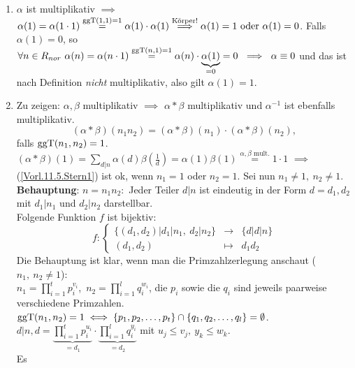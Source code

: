 \documentclass[a4paper,twoside,DIV15,BCOR12mm]{scrbook}
\begin{document}
\begin{beweis}
    \begin{enumerate}\item
        $\alpha$ ist multiplikativ $\implies$ $\alpha(1)=\alpha(1
        \cdot 1)\stackrel{\mathop{\rm ggT}\nolimits(1,1)=1}{=} \alpha(1) \cdot \alpha(1)
        \stackrel{\text{Körper!}}{\implies} \alpha(1)=1 \text{ oder }
        \alpha(1)=0$. Falls $\alpha(1)=0$, so $\forall n\in R_{nor}\
        \alpha(n)=\alpha(n \cdot
        1)\stackrel{\mathop{\rm ggT}\nolimits(n,1)=1}{=}\alpha(n)\cdot
        \underbrace{\alpha(1)}_{=0}=0\ \implies\ \alpha \equiv 0$ und
        das ist nach Definition
        \emph{nicht} multiplikativ, also gilt $\alpha(1)=1$.

        \item Zu zeigen: $\alpha,\beta$ multiplikativ $\implies$ $ \alpha*\beta$
        multiplikativ und $\alpha^{-1}$ ist ebenfalls multiplikativ.
        \begin{equation}(\alpha * \beta)(n_1 n_2)=(\alpha * \beta) (n_1) \cdot
        (\alpha * \beta)(n_2)\label{Vorl.11.5.Stern1},\end{equation}
        falls $\mathop{\rm ggT}\nolimits(n_1,n_2)=1$. $(\alpha *
        \beta)(1)=\sum_{d|n} \alpha(d) \beta(\frac 1 d )=\alpha(1)
        \beta(1)\stackrel{\alpha,\beta \text{ mult.}}{=}1\cdot 1$
        $\implies$ (\ref{Vorl.11.5.Stern1}) ist ok, wenn $n_1=1$ oder
        $n_2=1$. Sei nun $n_1 \neq 1,\ n_2\neq 1$.\\
        \textbf{Behauptung}: $n=n_1 n_2:$ Jeder Teiler $d|n$ ist
        eindeutig in der Form $d=d_1,d_2$ mit $d_1|n_1$ und
        $d_2|n_2$ darstellbar.\\
        Folgende Funktion $f$ ist bijektiv:
        $$f:\left\{\begin{array}{rcl}
            \{(d_1,d_2) \big| d_1|n_1,\ d_2|n_2\} &\to&
            \{d\big|d|n\}\\
            (d_1,d_2) & \mapsto & d_1 d_2
        \end{array}\right.$$
        Die Behauptung ist klar, wenn man die Primzahlzerlegung
        anschaut ($n_1,\ n_2 \neq 1$):\\
        $n_1=\prod_{i=1}^t p_i^{v_i}$,\ $n_2=\prod_{i=1}^l q_i^{w_i}$,
        die $p_i$ sowie die $q_i$ sind jeweils paarweise
        verschiedene Primzahlen. $\mathop{\rm ggT}\nolimits(n_1,n_2)=1 \iff
        \{p_1,p_2,\dotsc,p_t\} \cap
        \{q_1,q_2,\dotsc,q_l\}=\emptyset$.\\
        $d|n, d=\underbrace{\prod_{i=1}^t p_i^{u_i}}_{=d_1} \cdot \underbrace{\prod_{i=1}^l
        q_i^{y_i}}_{=d_2}$ mit $u_j \leq v_j,\ y_k \leq w_k$.\\ Es

\end{enumerate}
\end{beweis}
\end{document}
